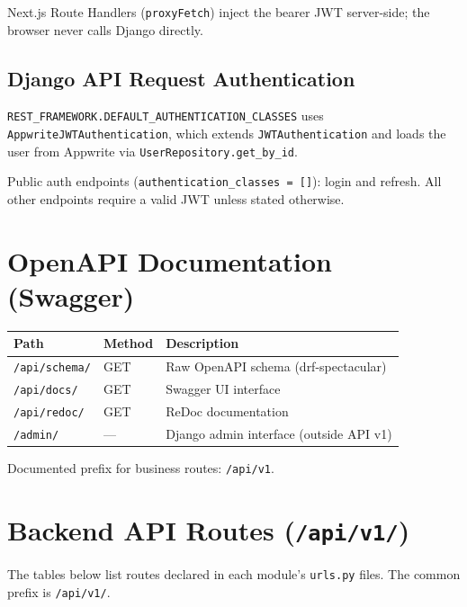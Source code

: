 \documentclass[11pt,a4paper]{article}
\begin{document}
Next.js Route Handlers (\texttt{proxyFetch}) inject the bearer JWT server-side; the browser never calls Django directly.

\subsection{Django API Request Authentication}

\texttt{REST\_FRAMEWORK.DEFAULT\_AUTHENTICATION\_CLASSES} uses \texttt{AppwriteJWTAuthentication}, which extends \texttt{JWTAuthentication} and loads the user from Appwrite via \texttt{UserRepository.get\_by\_id}.

Public auth endpoints (\texttt{authentication\_classes = []}): login and refresh. All other endpoints require a valid JWT unless stated otherwise.

\section{OpenAPI Documentation (Swagger)}

\begin{longtable}{@{}llp{7cm}@{}}
\toprule
\textbf{Path} & \textbf{Method} & \textbf{Description} \\
\midrule
\endhead
\texttt{/api/schema/} & GET & Raw OpenAPI schema (drf-spectacular) \\
\texttt{/api/docs/} & GET & Swagger UI interface \\
\texttt{/api/redoc/} & GET & ReDoc documentation \\
\texttt{/admin/} & --- & Django admin interface (outside API v1) \\
\bottomrule
\end{longtable}

Documented prefix for business routes: \texttt{/api/v1}.

\section{Backend API Routes (\texttt{/api/v1/})}

The tables below list routes declared in each module's \texttt{urls.py} files. The common prefix is \texttt{/api/v1/}.
\end{document}
